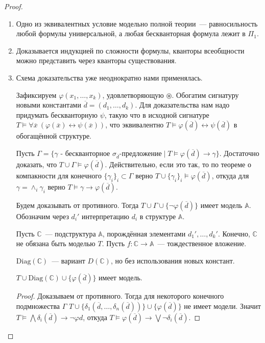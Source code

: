 \begin{proof}\
    \begin{enumerate}
        \item Одно из эквивалентных условие модельно полной теории~— равносильность любой формулы универсальной, а любая бескванторная формула лежит в $\Pi_1$.

        \item %
        Доказывается индукцией по сложности формулы, кванторы всеобщности можно представить через кванторы существования.

   \item
       Схема доказательства уже неоднократно нами применялась.

       Зафиксируем $\varphi(x_1, \ldots, x_k)$, удовлетворяющую $\circledast$. Обогатим сигнатуру новыми константами $\overline{d} = (d_1, \ldots, d_k)$. Для доказательства нам надо придумать бескванторную $\psi$, такую что в исходной сигнатуре $T\models \forall \overline{x}~(\varphi(\overline{x})\leftrightarrow\psi(\overline{x}))$, что эквивалентно $T\models \varphi(\overline{d}) \leftrightarrow \psi(\overline{d})$ в обогащённой структуре.

       Пусть $\Gamma = \{\gamma \text{ - бескванторное }\sigma_{\overline{d}} \text{-предложение}  \mid T\models \varphi(\overline{d})\rightarrow \gamma\}$. Достаточно доказать, что $T\cup\Gamma\models\varphi(\overline{d})$. Действительно, если это так, то по теореме о компакности для конечного $\{\gamma_i\}_i\subset\Gamma$ верно $T\cup\{\gamma_i\}_i\models \varphi(\overline{d})$, откуда для $\gamma=\wedge_i\gamma_i$ верно $T\models \gamma\rightarrow \varphi(\overline{d})$.

       Будем доказывать от противного. Тогда $T\cup\Gamma\cup\{\neg\varphi(\overline{d})\}$ имеет модель $\mathbb{A}$. Обозначим через $d_i'$ интерпретацию $d_i$ в структуре $\mathbb{A}$.

       Пусть $\mathbb{C}$~— подструктура $\mathbb{A}$, порождённая элементами $d_1',\ldots, d_k'$. Конечно, $\mathbb{C}$ не обязана быть моделью $T$. Пусть $f:\mathbb{C}\rightarrow\mathbb{A}$~— тождественное вложение.
        
       $\text{Diag}(\mathbb{C})$~— вариант $D(\mathbb{C})$, но без использования новых констант.

       \begin{stat} %
        $T\cup\text{Diag}(\mathbb{C})\cup\{\varphi(\overline{d})\}$ имеет модель.
       \end{stat}
       \begin{proof}
           Доказываем от противного. Тогда для некоторого конечного подмножества $\Gamma$ $T\cup\{\delta_1(\overline{d},\ldots,\delta_n(\overline{d}))\}\cup\{\varphi(\overline{d})\}$ не имеет модели. Значит $T\models \bigwedge\delta_i(\overline{d})\rightarrow\neg\varphi{d}$, откуда $T\models \varphi(\overline{d})\rightarrow\bigvee\neg\delta_i(\overline{d})$.
           

\end{proof}
\end{enumerate}
\end{proof}

